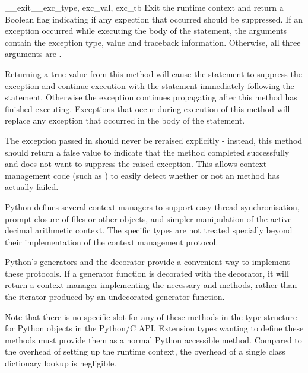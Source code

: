 \begin{methoddesc}{__exit__}{exc_type, exc_val, exc_tb}
  Exit the runtime context and return a Boolean flag indicating if any
  expection that occurred should be suppressed. If an exception
  occurred while executing the body of the  statement, the
  arguments contain the exception type, value and traceback information.
  Otherwise, all three arguments are .

  Returning a true value from this method will cause the 
  statement to suppress the exception and continue execution with the
  statement immediately following the  statement. Otherwise
  the exception continues propagating after this method has finished
  executing. Exceptions that occur during execution of this method will
  replace any exception that occurred in the body of the 
  statement.

  The exception passed in should never be reraised explicitly - instead,
  this method should return a false value to indicate that the method
  completed successfully and does not want to suppress the raised
  exception. This allows context management code (such as
  ) to easily detect whether or not an
   method has actually failed.
\end{methoddesc}

Python defines several context managers to support easy thread
synchronisation, prompt closure of files or other objects, and
simpler manipulation of the active decimal arithmetic
context. The specific types are not treated specially beyond
their implementation of the context management protocol.

Python's generators and the  decorator
provide a convenient way to implement these protocols.  If a generator
function is decorated with the 
decorator, it will return a context manager implementing the necessary
 and  methods, rather than the
iterator produced by an undecorated generator function.

Note that there is no specific slot for any of these methods in the
type structure for Python objects in the Python/C API. Extension
types wanting to define these methods must provide them as a normal
Python accessible method. Compared to the overhead of setting up the
runtime context, the overhead of a single class dictionary lookup
is negligible.


